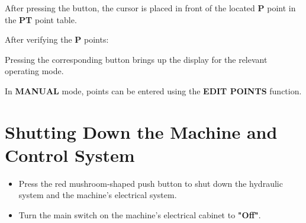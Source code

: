 \vspace{.5cm}

\begin{itemize}
\end{itemize}

After pressing the button, the cursor is placed in front of the located \textbf{P} point in the \textbf{PT} point table.

After verifying the \textbf{P} points:

\begin{itemize}
\end{itemize}

Pressing the corresponding button brings up the display for the relevant operating mode.

\notes

In \textbf{MANUAL} mode, points can be entered using the \textbf{EDIT POINTS} function.

\section{Shutting Down the Machine and Control System}

\begin{itemize}
\end{itemize}

\vspace{.5cm}

\begin{itemize}
    \item Press the red mushroom-shaped push button to shut down the hydraulic system and the machine's electrical system.
    \item Turn the main switch on the machine's electrical cabinet to \textbf{"Off"}.
\end{itemize}